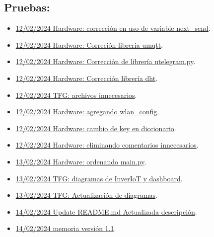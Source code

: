 \subsection{Pruebas:}
\begin{itemize}
\item \href{https://github.com/JLCaballeroMQ/Proyecto_TFG_UBU_23_24/tree/bedce40a85d3bff1f137716caaf2130fad809b2b}{12/02/2024 Hardware: corrección en uso de variable next_send}.
\item \href{https://github.com/JLCaballeroMQ/Proyecto_TFG_UBU_23_24/tree/d81248ff95190fccffd842db27305bf0097c3895}{12/02/2024 Hardware: Correción libreria umqtt}.
\item \href{https://github.com/JLCaballeroMQ/Proyecto_TFG_UBU_23_24/tree/51d092af7c2913c27df92cfc43a63109e12db40d}{12/02/2024 Hardware: Corrección de librería utelegram.py}.
\item \href{https://github.com/JLCaballeroMQ/Proyecto_TFG_UBU_23_24/tree/0cbe9e347b54a65d5cc151cb3187f016087cf028}{12/02/2024 Hardware: Corrección librería dht}.
\item \href{https://github.com/JLCaballeroMQ/Proyecto_TFG_UBU_23_24/tree/033adf03ec72e6aac5f86ce2f7a4424a72afc1e9}{12/02/2024 TFG: archivos innecesarios}.
\item \href{https://github.com/JLCaballeroMQ/Proyecto_TFG_UBU_23_24/tree/68c323116ac06f004c67d1479c98a97f52c4f2e3}{12/02/2024 Hardware: agregando wlan_config}.
\item \href{https://github.com/JLCaballeroMQ/Proyecto_TFG_UBU_23_24/tree/9c65bcf4b090ccd53287fb85ccd28af89a7d92c6}{12/02/2024 Hardware: cambio de key en diccionario}.
\item \href{https://github.com/JLCaballeroMQ/Proyecto_TFG_UBU_23_24/tree/581f09f7e817c68102a7672620214e20a0c6b04a}{12/02/2024 Hardware: eliminando comentarios innecesarios}.
\item \href{https://github.com/JLCaballeroMQ/Proyecto_TFG_UBU_23_24/tree/40d409abb0466bbb7f2dab01c36025848191ce15}{13/02/2024 Hardware: ordenando main.py}.
\item \href{https://github.com/JLCaballeroMQ/Proyecto_TFG_UBU_23_24/tree/3d31c83a821b49ae7a4acc89b0ae18f134ed09cb}{13/02/2024 TFG: diagramas de InverIoT y dashboard}.
\item \href{https://github.com/JLCaballeroMQ/Proyecto_TFG_UBU_23_24/tree/7609fef7f7a5ad034d391570dec58502d8d273a9}{13/02/2024 TFG: Actualización de diagramas}.
\item \href{https://github.com/JLCaballeroMQ/Proyecto_TFG_UBU_23_24/tree/42a652e595eaa1c4404ae2b0d2a8ec03200c4806}{14/02/2024 Update README.md Actualizada descripción}.
\item \href{https://github.com/JLCaballeroMQ/Proyecto_TFG_UBU_23_24/tree/de1fb31250f55e99ac2a999076d156706e5dd86a}{14/02/2024 memoria versión 1.1}.
\end{itemize}


